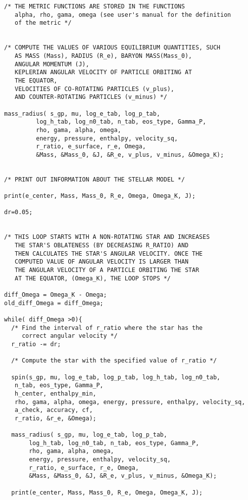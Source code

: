 \begin{verbatim}
  /* THE METRIC FUNCTIONS ARE STORED IN THE FUNCTIONS 
     alpha, rho, gama, omega (see user's manual for the definition
     of the metric */


  /* COMPUTE THE VALUES OF VARIOUS EQUILIBRIUM QUANTITIES, SUCH
     AS MASS (Mass), RADIUS (R_e), BARYON MASS(Mass_0), 
     ANGULAR MOMENTUM (J), 
     KEPLERIAN ANGULAR VELOCITY OF PARTICLE ORBITING AT 
     THE EQUATOR,
     VELOCITIES OF CO-ROTATING PARTICLES (v_plus),
     AND COUNTER-ROTATING PARTICLES (v_minus) */

  mass_radius( s_gp, mu, log_e_tab, log_p_tab, 
	       log_h_tab, log_n0_tab, n_tab, eos_type, Gamma_P, 
	       rho, gama, alpha, omega, 
	       energy, pressure, enthalpy, velocity_sq,
	       r_ratio, e_surface, r_e, Omega,
	       &Mass, &Mass_0, &J, &R_e, v_plus, v_minus, &Omega_K);


  /* PRINT OUT INFORMATION ABOUT THE STELLAR MODEL */

  print(e_center, Mass, Mass_0, R_e, Omega, Omega_K, J);

  dr=0.05;
 

  /* THIS LOOP STARTS WITH A NON-ROTATING STAR AND INCREASES
     THE STAR'S OBLATENESS (BY DECREASING R_RATIO) AND 
     THEN CALCULATES THE STAR'S ANGULAR VELOCITY. ONCE THE
     COMPUTED VALUE OF ANGULAR VELOCITY IS LARGER THAN 
     THE ANGULAR VELOCITY OF A PARTICLE ORBITING THE STAR
     AT THE EQUATOR, (Omega_K), THE LOOP STOPS */
    
  diff_Omega = Omega_K - Omega;
  old_diff_Omega = diff_Omega;
  
  while( diff_Omega >0){
    /* Find the interval of r_ratio where the star has the
       correct angular velocity	*/
    r_ratio -= dr;
	
    /* Compute the star with the specified value of r_ratio	*/

    spin(s_gp, mu, log_e_tab, log_p_tab, log_h_tab, log_n0_tab, 
	 n_tab, eos_type, Gamma_P, 
	 h_center, enthalpy_min,
	 rho, gama, alpha, omega, energy, pressure, enthalpy, velocity_sq,
	 a_check, accuracy, cf,
	 r_ratio, &r_e, &Omega);
   
    mass_radius( s_gp, mu, log_e_tab, log_p_tab, 
		 log_h_tab, log_n0_tab, n_tab, eos_type, Gamma_P, 
		 rho, gama, alpha, omega, 
		 energy, pressure, enthalpy, velocity_sq,
		 r_ratio, e_surface, r_e, Omega,
		 &Mass, &Mass_0, &J, &R_e, v_plus, v_minus, &Omega_K);

    print(e_center, Mass, Mass_0, R_e, Omega, Omega_K, J);
   

\end{verbatim}
